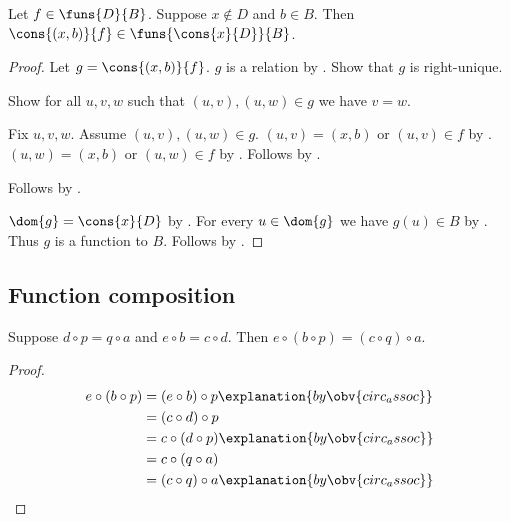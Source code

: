 \begin{proposition}\label{extend_function_at_new_point}
    Let $f\in\funs{D}{B}$.
    Suppose $x\notin D$ and $b\in B$.
    Then $\cons{(x,b)}{f}\in\funs{\cons{x}{D}}{B}$.
\end{proposition}
\begin{proof}
    Let $g=\cons{(x,b)}{f}$.
    $g$ is a relation by .
    Show that $g$ is right-unique.
    \begin{subproof}
        Show for all $u,v,w$ such that $(u,v),(u,w)\in g$ we have $v=w$.
        \begin{subproof}
            Fix $u,v,w$.
            Assume $(u,v),(u,w)\in g$.
            $(u,v)=(x,b)$ or $(u,v)\in f$ by .
            $(u,w)=(x,b)$ or $(u,w)\in f$ by .
            Follows by .
        \end{subproof}
        Follows by .
    \end{subproof}
    $\dom{g}=\cons{x}{D}$ by .
    For every $u\in\dom{g}$ we have $g(u)\in B$
        by .
    Thus $g$ is a function to $B$.
    Follows by .
\end{proof}


\subsection{Function composition}

\begin{proposition}\label{commuting_squares_composition}
    Suppose $d\circ p=q\circ a$ and
        $e\circ b=c\circ d$.
    Then $e\circ(b\circ p)=(c\circ q)\circ a$.
\end{proposition}
\begin{proof}
    \begin{align*}
        e\circ(b\circ p)
            &= (e\circ b)\circ p
                \explanation{by \obv{circ_assoc}}
            \\
            &= (c\circ d)\circ p
            \\
            &= c\circ(d\circ p)
                \explanation{by \obv{circ_assoc}}
            \\
            &= c\circ(q\circ a)
            \\
            &= (c\circ q)\circ a
                \explanation{by \obv{circ_assoc}}
    \end{align*}
\end{proof}

